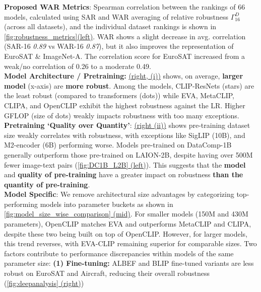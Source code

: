 \noindent\textbf{Proposed WAR Metrics}: 
Spearman correlation between the rankings of 66 models, calculated using SAR and WAR averaging of relative robustness $\Gamma^{D}_{16}$ (across all datasets), and the individual dataset rankings is shown in \underline{\cref{fig:robustness_metrics}(left)}.
WAR shows a slight decrease in avg. correlation (SAR-16 \textit{0.89} vs WAR-16 \textit{0.87}), but it also improves the representation of EuroSAT \& ImageNet-A.
The correlation score for EuroSAT increased from a weak/no correlation of 0.26 to a moderate 0.49. \vspace{5pt} \\
\noindent \textbf{Model Architecture / Pretraining:}
\underline{ (right, (i))} shows, on average, 
\textbf{larger model} (x-axis) are \textbf{more robust}. 
Among the models, 
CLIP-ResNets (stars) are the least robust (compared to transformers (dots)) while EVA, MetaCLIP, CLIPA, and OpenCLIP exhibit the highest robustness against the LR.
Higher GFLOP (size of dots) weakly impacts robustness with too many exceptions. \vspace{5pt}\\
\noindent \textbf{Pretraining `Quality over Quantity'}: 
\underline{ (right (ii))} shows pre-training dataset size weakly correlates with robustness, with exceptions like SigLIP (10B), and M2-encoder (6B) performing worse. 
Models pre-trained on DataComp-1B generally outperform those pre-trained on LAION-2B, despite having over 500M fewer image-text pairs (\underline{\cref{fig:DC1B_L2B} (left)}). 
This suggests that the \textbf{model} and \textbf{quality of pre-training} have a greater impact on robustness \textbf{than the quantity of pre-training}. \vspace{5pt}\\
\noindent \textbf{Model Specific}:
We remove architectural size advantages by categorizing top-performing models into parameter buckets as shown in \underline{\cref{fig:model_size_wise_comparison} (mid)}. 
For smaller models (150M and 430M parameters), OpenCLIP matches EVA and outperforms MetaCLIP and CLIPA, despite these two being built on top of OpenCLIP. 
However, for larger models, this trend reverses, with EVA-CLIP remaining superior for comparable sizes.
Two factors contribute to performance discrepancies within models of the same parameter size:
\textbf{(1) Fine-tuning:} 
ALBEF and BLIP fine-tuned variants 
are less robust on EuroSAT and Aircraft, reducing their overall robustness (\underline{\cref{fig:deepanalysis} (right)})
